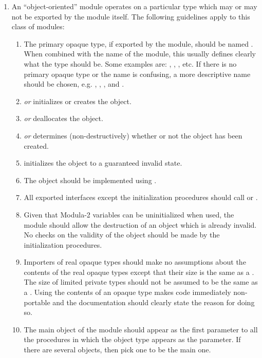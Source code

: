 \begin{enumerate}
\item
    An ``object-oriented'' module operates on a particular type which
    may or may not be exported by the module itself.  The following guidelines
    apply to this class of modules:
    \begin{enumerate}
    \item
        The primary opaque type, if exported by the module, should be named
        .  When combined with the name of the module, this
        usually defines clearly what the type should be. Some
        examples are: , ,
        , etc.  If there is no primary opaque type
	or the name  is confusing, a more descriptive
        name should be chosen, e.g. , ,
        , and .
    \item
         {\em or}   
         initializes or creates the object.
    \item
         {\em or}  deallocates the object.
    \item
         {\em or}  
        determines (non-destructively) whether or not the object has been 
        created.
    \item
         initializes the object to a guaranteed
        invalid state.
    \item
        The object should be implemented using .
    \item
        All exported interfaces except the initialization procedures
        should call  or .
    \item
        Given that Modula-2 variables can be uninitialized when used,
        the module should allow the destruction of an object which is already
        invalid.  No checks on the validity of the object
        should be made by the initialization procedures.
    \item
        Importers of real opaque types should make no assumptions about the
        contents of the real opaque types except that their size is the same 
	as a .
        The size of limited private types should not be assumed to be
        the same as a .  Using the contents of 
	an opaque type
        makes code immediately non-portable and the documentation
        should clearly state the reason for doing so.
    \item
        The main object of the module should appear as the first
        parameter to all the procedures in which the object type 
        appears as the parameter.  If there are several objects, 
        then pick one to be the main one.
    \end{enumerate}


\end{enumerate}
